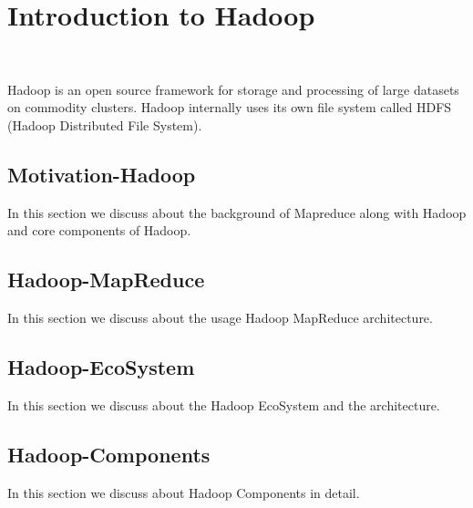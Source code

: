 \section{Introduction to Hadoop}
\label{c:spark}
\FILENAME\

Hadoop is an open source framework for storage and processing of large
datasets on commodity clusters. Hadoop internally uses its own file
system called HDFS (Hadoop Distributed File System).

\subsection{Motivation-Hadoop}
\label{s:motivation-spark}

In this section we discuss about the background of Mapreduce along with Hadoop and
core components of Hadoop.

\subsection{Hadoop-MapReduce}

In this section we discuss about the usage Hadoop MapReduce architecture.

\subsection{Hadoop-EcoSystem}

In this section we discuss about the Hadoop EcoSystem and the architecture. 

\subsection{Hadoop-Components}

In this section we discuss about Hadoop Components in detail.


